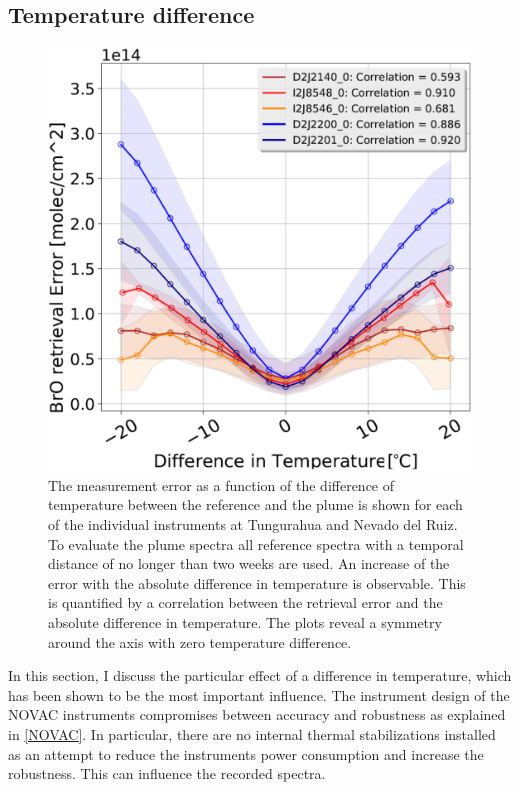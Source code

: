 \subsection{Temperature difference}
\begin{figure}[h!]
    \centering
    \includegraphics[width=0.7\linewidth]{Bilder/DiffTempallInstruments1}
    \caption[The  measurement error as a function of the difference of temperature between the reference and the plume is shown for each of the individual instruments at Tungurahua and Nevado del Ruiz.]{The  measurement error as a function of the difference of temperature between the reference and the plume is shown for each of the individual instruments at Tungurahua and Nevado del Ruiz. To evaluate the plume spectra all reference spectra with a temporal distance of no longer than two weeks are used. An increase of the  error with the absolute difference in temperature is observable. This is quantified by a correlation between the  retrieval error and the absolute difference in temperature. The plots reveal a symmetry around the axis with zero temperature difference.}
    \label{fig:difftemp}
\end{figure}
In this section, I discuss the particular effect of a difference in temperature, which has been shown to be the most important influence.
The instrument design of the NOVAC instruments compromises between accuracy and robustness as explained in \cref{NOVAC}. In particular, there are no internal thermal stabilizations installed as an attempt to reduce the instruments power consumption and increase the robustness. This can influence the recorded spectra.\\
